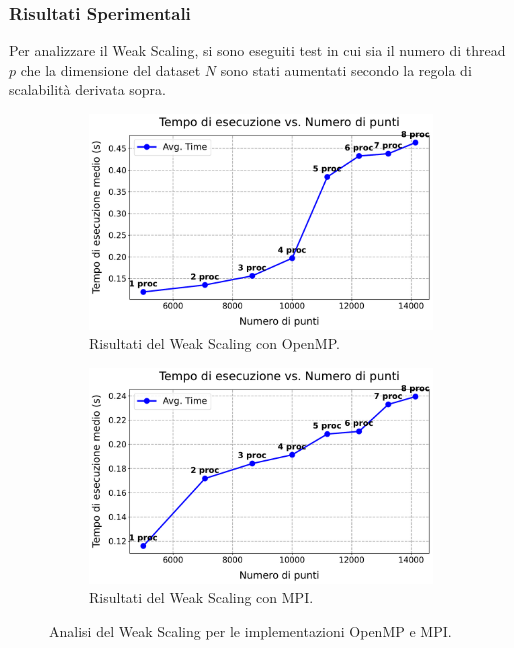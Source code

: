 \documentclass[letterpaper,11pt,leqno]{article}
\begin{document}
\subsubsection{Risultati Sperimentali}
Per analizzare il Weak Scaling, si sono eseguiti test in cui sia il numero di thread \( p \) che la dimensione del dataset \( N \) sono stati aumentati secondo la regola di scalabilità derivata sopra.

\begin{figure}[h]
    \centering
    \begin{subfigure}{0.48\textwidth}
        \centering
        \includegraphics[scale=0.3]{graphs/omp_weak_scaling.pdf}
        \caption{Risultati del Weak Scaling con OpenMP.}
        \label{f:weak_scaling_omp}
    \end{subfigure}
    \hfill
    \begin{subfigure}{0.48\textwidth}
        \centering
        \includegraphics[scale=0.3]{graphs/mpi_weak_scaling.pdf}
        \caption{Risultati del Weak Scaling con MPI.}
        \label{f:weak_scaling_mpi}
    \end{subfigure}
    \caption{Analisi del Weak Scaling per le implementazioni OpenMP e MPI.}
    \label{f:weak_scaling_graphs}
\end{figure}
\end{document}

